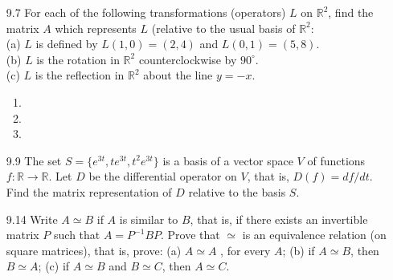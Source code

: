 \documentclass[12pt]{article}
\theoremstyle{plain}
\theoremstyle{definition}
\theoremstyle{plain}
\begin{document}
\begin{enumerate}
\item[9.7]For each of the following transformations (operators) $L$ on $\mathbb{R}^2$, find the matrix $A$ which represents $L$ (relative to the usual basis of $\mathbb{R}^2$:\\
(a) $L$ is defined by $L(1,0)=(2,4)$ and $L(0,1)=(5,8)$.\\
(b) $L$ is the rotation in $\mathbb{R}^2$ counterclockwise by $90^\circ$.\\
(c) $L$ is the reflection in $\mathbb{R}^2$ about the line $y=-x$.
	\begin{enumerate}
	\item
	\item
	\item
	\end{enumerate}
\item[9.9]The set $S=\{e^{3t},te^{3t},t^2e^{3t}\}$ is a basis of a vector space $V$ of functions $f: \mathbb{R}\rightarrow\mathbb{R}$. Let $D$ be the differential operator on $V$, that is, $D(f)=df/dt$. Find the matrix representation of $D$ relative to the basis $S$.
\item[9.14]Write $A\simeq B$ if $A$ is similar to $B$, that is, if there exists an invertible matrix $P$ such that $A=P^{-1}BP$. Prove that $\simeq$ is an equivalence relation (on square matrices), that is, prove: (a) $A\simeq A$ , for every $A$; (b) if $A \simeq B$, then $B\simeq A$; (c) if $A\simeq B$ and $B\simeq C$, then $A\simeq C$.\\


\end{enumerate}
\end{document}
